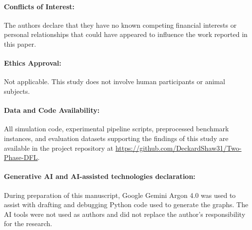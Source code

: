 \documentclass[11pt,a4paper]{article}
\theoremstyle{definition}
\theoremstyle{remark}
\begin{document}
\paragraph{Conflicts of Interest:} The authors declare that they have no known competing financial interests or personal relationships that could have appeared to influence the work reported in this paper.

\paragraph{Ethics Approval:} Not applicable. This study does not involve human participants or animal subjects.

\paragraph{Data and Code Availability:} All simulation code, experimental pipeline scripts, preprocessed benchmark instances, and evaluation datasets supporting the findings of this study are available in the project repository at \url{https://github.com/DeckardShaw31/Two-Phase-DFL}.

\paragraph{Generative AI and AI-assisted technologies declaration:}  During preparation of this manuscript, Google Gemini Argon 4.0 was used to assist with drafting and debugging Python code used to generate the graphs. The AI tools were not used as authors and did not replace the author’s responsibility for the research.


\begingroup
\raggedright

\endgroup
\end{document}
